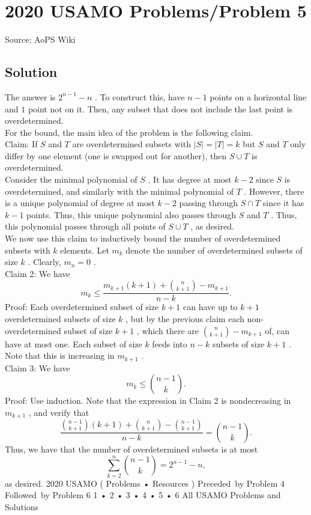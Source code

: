 \documentclass[12pt]{article}
\begin{document}
\section*{{2020 USAMO Problems/Problem 5}}
Source: AoPS Wiki

\subsection*{Solution}
The answer is $2^{n-1}-n$ . To construct this, have $n-1$ points on a horizontal line and $1$ point not on it. Then, any subset that does not include the last point is overdetermined.\\ For the bound, the main idea of the problem is the following claim.\\ Claim: If $S$ and $T$ are overdetermined subsets with $|S|=|T|=k$ but $S$ and $T$ only differ by one element (one is swapped out for another), then $S\cup T$ is overdetermined.\\ Consider the minimal polynomial of $S$ . It has degree at most $k-2$ since $S$ is overdetermined, and similarly with the minimal polynomial of $T$ . However, there is a unique polynomial of degree at most $k-2$ passing through $S\cap T$ since it has $k-1$ points. Thus, this unique polynomial also passes through $S$ and $T$ . Thus, this polynomial passes through all points of $S\cup T$ , as desired.\\ We now use this claim to inductively bound the number of overdetermined subsets with $k$ elements. Let $m_k$ denote the number of overdetermined subsets of size $k$ . Clearly, $m_n=0$ .\\ Claim 2: We have \[m_k\leq \frac{m_{k+1}(k+1)+{n\choose k+1}-m_{k+1}}{n-k}.\] Proof: Each overdetermined subset of size $k+1$ can have up to $k+1$ overdetermined subsets of size $k$ , but by the previous claim each non-overdetermined subset of size $k+1$ , which there are ${n\choose k+1}-m_{k+1}$ of, can have at most one. Each subset of size $k$ feeds into $n-k$ subsets of size $k+1$ . Note that this is increasing in $m_{k+1}$ .\\ Claim 3: We have \[m_k\leq {n-1\choose k}.\] Proof: Use induction. Note that the expression in Claim 2 is nondecreasing in $m_{k+1}$ , and verify that \[\frac{{n-1\choose k+1}(k+1)+{n\choose k+1}-{n-1\choose k+1}}{n-k}={n-1\choose k}.\] Thus, we have that the number of overdetermined subsets is at most \[\sum_{k=2}^n {n-1\choose k}=2^{n-1}-n,\] as desired. 2020 USAMO ( Problems • Resources ) Preceded by Problem 4 Followed by Problem 6 1 • 2 • 3 • 4 • 5 • 6 All USAMO Problems and Solutions
\end{document}
